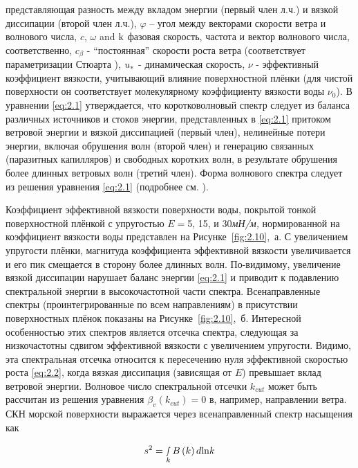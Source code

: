 \noindent представляющая разность между вкладом энергии (первый член л.ч.) и вязкой диссипации (второй член л.ч.), $\varphi $ -- угол между векторами скорости ветра и волнового числа, $c$, $\omega $ and ${\rm k}$ фазовая скорость, частота и вектор волнового числа, соответственно, $c_{\beta } $ - ``постоянная'' скорости роста ветра (соответствует параметризации Стюарта \citep{Stewart1974}), $u_{{\rm *}} $ - динамическая скорость, $\nu $ - эффективный коэффициент вязкости, учитывающий влияние поверхностной плёнки (для чистой поверхности он соответствует молекулярному коэффициенту вязкости воды $\nu _{0} $). В уравнении \eqref{eq:2.1} утверждается, что коротковолновый спектр следует из баланса различных источников и стоков энергии, представленных в \eqref{eq:2.1} притоком ветровой энергии и вязкой диссипацией (первый член), нелинейные потери энергии, включая обрушения волн (второй член) и генерацию связанных (паразитных капилляров) и свободных коротких волн, в результате обрушения более длинных ветровых волн (третий член). Форма волнового спектра следует из решения уравнения \eqref{eq:2.1} (подробнее см. \citep{Kudryavtsev2005}).

Коэффициент эффективной вязкости поверхности воды, покрытой тонкой поверхностной плёнкой с упругостью $E=$5, 15, и 30\textit{мН/м,} нормированной на коэффициент вязкости воды представлен на Рисунке~\ref{fig:2.10},~а. С увеличением упругости плёнки, магнитуда коэффициента эффективной вязкости увеличивается и его пик смещается в сторону более длинных волн. По-видимому, увеличение вязкой диссипации нарушает баланс энергии \eqref{eq:2.1} и приводит к подавлению спектральной энергии в высокочастотной части спектра. Всенаправленные спектры (проинтегрированные по всем направлениям) в присутствии поверхностных плёнок показаны на Рисунке~\ref{fig:2.10},~б. Интересной особенностью этих спектров является отсечка спектра, следующая за низкочастотны сдвигом эффективной вязкости с увеличением упругости. Видимо, эта спектральная отсечка относится к пересечению нуля эффективной скоростью роста \eqref{eq:2.2}, когда вязкая диссипация (зависящая от $E$) превышает вклад ветровой энергии. Волновое число спектральной отсечки $k_{cut} $ может быть рассчитан из решения уравнения $\beta _{v} (k_{cut} )=0$ в, например, направлении ветра. СКН морской поверхности выражается через всенаправленный спектр насыщения как



\begin{equation} \label{eq:2.3} 
s^{2} =\mathop{\smallint }\limits_{k}^{} B\left(k\right)d{\rm ln}k 
\end{equation} 


